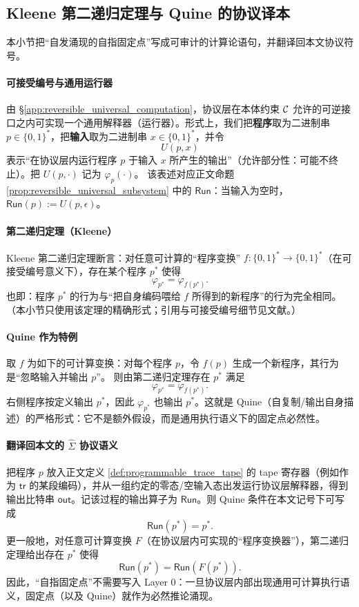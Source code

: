 \subsection{Kleene 第二递归定理与 Quine 的协议译本}\label{app:recursion_theorem_and_quine}
本小节把“自发涌现的自指固定点”写成可审计的计算论语句，并翻译回本文协议符号。

\paragraph{可接受编号与通用运行器}
由 \S\ref{app:reversible_universal_computation}，协议层在本体约束 \(\mathcal{C}\) 允许的可逆接口之内可实现一个通用解释器（运行器）。形式上，我们把\textbf{程序}取为二进制串 \(p\in\{0,1\}^\ast\)，把\textbf{输入}取为二进制串 \(x\in\{0,1\}^\ast\)，并令
$$
U(p,x)
$$
表示“在协议层内运行程序 \(p\) 于输入 \(x\) 所产生的输出”（允许部分性：可能不终止）。把 \(U(p,\cdot)\) 记为 \(\varphi_p(\cdot)\)。
该表述对应正文命题 \ref{prop:reversible_universal_subsystem} 中的 \(\mathsf{Run}\)：当输入为空时，\(\mathsf{Run}(p):=U(p,\epsilon)\)。

\paragraph{第二递归定理（Kleene）}
Kleene 第二递归定理断言：对任意可计算的“程序变换” \(f:\{0,1\}^\ast\to\{0,1\}^\ast\)（在可接受编号意义下），存在某个程序 \(p^\ast\) 使得
$$
\varphi_{p^\ast}=\varphi_{f(p^\ast)}.
$$
也即：程序 \(p^\ast\) 的行为与“把自身编码喂给 \(f\) 所得到的新程序”的行为完全相同。（本小节只使用该定理的精确形式；引用与可接受编号细节见文献。）
\cite{Rogers1967}

\paragraph{Quine 作为特例}
取 \(f\) 为如下的可计算变换：对每个程序 \(p\)，令 \(f(p)\) 生成一个新程序，其行为是“忽略输入并输出 \(p\)”。
则由第二递归定理存在 \(p^\ast\) 满足
$$
\varphi_{p^\ast}=\varphi_{f(p^\ast)}.
$$
右侧程序按定义输出 \(p^\ast\)，因此 \(\varphi_{p^\ast}\) 也输出 \(p^\ast\)。这就是 Quine（自复制/输出自身描述）的严格形式：它不是额外假设，而是通用执行语义下的固定点必然性。

\paragraph{翻译回本文的 \(\widehat\Sigma\) 协议语义}
把程序 \(p\) 放入正文定义 \ref{def:programmable_trace_tape} 的 tape 寄存器（例如作为 \(\mathsf{tr}\) 的某段编码），并从一组约定的零态/空输入态出发运行协议层解释器，得到输出比特串 \(\mathsf{out}\)。记该过程的输出算子为 \(\mathsf{Run}\)。则 Quine 条件在本文记号下可写成
$$
\mathsf{Run}(p^\ast)=p^\ast.
$$
更一般地，对任意可计算变换 \(F\)（在协议层内可实现的“程序变换器”），第二递归定理给出存在 \(p^\ast\) 使得
$$
\mathsf{Run}(p^\ast)=\mathsf{Run}(F(p^\ast)).
$$
因此，“自指固定点”不需要写入 Layer 0：一旦协议层内部出现通用可计算执行语义，固定点（以及 Quine）就作为必然推论涌现。

